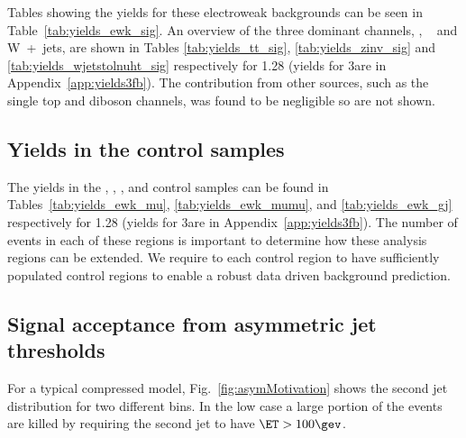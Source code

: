 Tables showing the yields for these electroweak backgrounds can be seen in Table~\ref{tab:yields_ewk_sig}.
An overview of the three dominant channels, \ttbar, \zInv~ and W~+~jets, are shown in Tables \ref{tab:yields_tt_sig}, 
\ref{tab:yields_zinv_sig} and \ref{tab:yields_wjetstolnuht_sig} respectively for 1.28\ifb 
(yields for 3\ifb are in Appendix~\ref{app:yields3fb}). The contribution from
other sources, such as the single top and diboson channels, was found to be
negligible so are not shown.


\newpage

\newpage

\newpage

\newpage


\newpage
\subsection{Yields in the control samples}

The yields in the \mj, \mmj, \ej, \eej and \gj control samples can be found in
Tables~\ref{tab:yields_ewk_mu}, \ref{tab:yields_ewk_mumu},
and \ref{tab:yields_ewk_gj} respectively for 1.28 \ifb (yields for 3\ifb are in Appendix~\ref{app:yields3fb}). 
The number of events in each of these regions is important to determine how these analysis regions can be extended. We require to 
each control region to have sufficiently populated control regions to enable a robust data driven background prediction.



\newpage

\newpage

\newpage

\subsection{Signal acceptance from asymmetric jet \Pt thresholds}

For a typical compressed model, Fig.~\ref{fig:asymMotivation} shows the second jet \PT
distribution for two different \HT bins. In the low \HT case a large portion of
the events are killed by requiring the second jet to have $\ET>100\gev$. 

